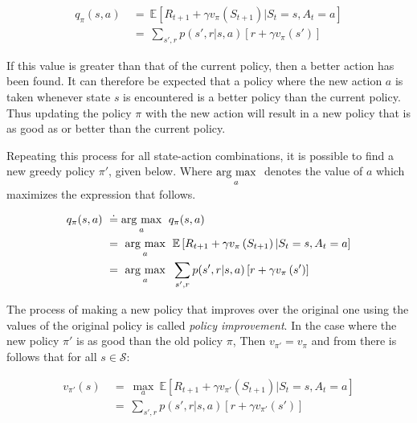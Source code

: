 \begin{equation}
  \begin{aligned}
    q_\pi(s, a) \ &=\ \mathbb{E} \left [ R_{t+1} + \gamma v_\pi \left ( S_{t+1}  \right ) | S_t=s, A_t=a \right ] \\
        &=\ \sum_{s', r} p(s',r|s,a) \left [ r + \gamma v_\pi \left ( s'  \right ) \right ]
  \end{aligned}
\end{equation}

If this value is greater than that of the current policy, then a better action has been found.
It can therefore be expected that a policy where the new action $a$ is taken whenever state $s$ is encountered is a better policy than the current policy.
Thus updating the policy $\pi$ with the new action will result in a new policy that is as good as or better than the current policy.

Repeating this process for all state-action combinations, it is possible to find a new greedy policy $\pi'$, given below.
Where $\underset{a}{\operatorname{arg}\,\operatorname{max}}\;$ denotes the value of $a$ which maximizes the expression that follows.

\begin{equation}
  \begin{aligned}
    q_\pi(s, a) \ &\doteq \underset{a}{\operatorname{arg}\,\operatorname{max}}\;\ q_\pi(s, a) \\
                  &=\ \underset{a}{\operatorname{arg}\,\operatorname{max}}\;\ \mathbb{E} \left [ R_{t+1} + \gamma v_\pi \left ( S_{t+1}  \right ) | S_t=s, A_t=a \right ] \\
        &=\ \underset{a}{\operatorname{arg}\,\operatorname{max}}\;\ \sum_{s', r} p(s',r|s,a) \left [ r + \gamma v_\pi \left ( s'  \right ) \right ]
  \end{aligned}
\end{equation}


The process of making a new policy that improves over the original one using the values of the original policy is called \emph{policy improvement}.
In the case where the new policy $\pi'$ is as good than the old policy $\pi$, Then $v_{\pi'}=v_{\pi}$ and from there is follows that for all $s \in \mathcal{S}$:

\begin{equation}
  \begin{aligned}
    v_{\pi'}(s) \ &=\ \max_{a}\ \mathbb{E} \left [ R_{t+1} + \gamma v_{\pi'}(S_{t+1}) | S_t=s, A_t=a \right ] \\
             &=\ \sum_{s', r} p(s',r|s,a) \left [ r+\gamma v_{\pi'}(s') \right ]
\end{aligned}
\end{equation}

